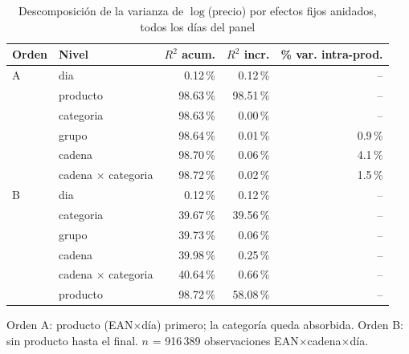 \begin{table}[htbp]
\caption{Descomposici\'on de la varianza de $\log$(precio) por efectos fijos anidados, todos los d\'ias del panel}
\label{tab:varianza}
\centering\scriptsize\setlength{\tabcolsep}{3pt}
\begin{tabular}{@{}llrrr@{}}
\toprule
Orden & Nivel & $R^2$ acum. & $R^2$ incr. & \% var. intra-prod. \\
\midrule
A & dia & 0.12\,\% & 0.12\,\% & -- \\
 & producto & 98.63\,\% & 98.51\,\% & -- \\
 & categoria & 98.63\,\% & 0.00\,\% & -- \\
 & grupo & 98.64\,\% & 0.01\,\% & 0.9\,\% \\
 & cadena & 98.70\,\% & 0.06\,\% & 4.1\,\% \\
 & cadena $\times$ categoria & 98.72\,\% & 0.02\,\% & 1.5\,\% \\
\midrule
B & dia & 0.12\,\% & 0.12\,\% & -- \\
 & categoria & 39.67\,\% & 39.56\,\% & -- \\
 & grupo & 39.73\,\% & 0.06\,\% & -- \\
 & cadena & 39.98\,\% & 0.25\,\% & -- \\
 & cadena $\times$ categoria & 40.64\,\% & 0.66\,\% & -- \\
 & producto & 98.72\,\% & 58.08\,\% & -- \\
\bottomrule\end{tabular}
\par\smallskip\raggedright\scriptsize Orden A: producto (EAN$\times$d\'ia) primero; la categor\'ia queda absorbida. Orden B: sin producto hasta el final. $n$ = 916\,389 observaciones EAN$\times$cadena$\times$d\'ia.
\end{table}
